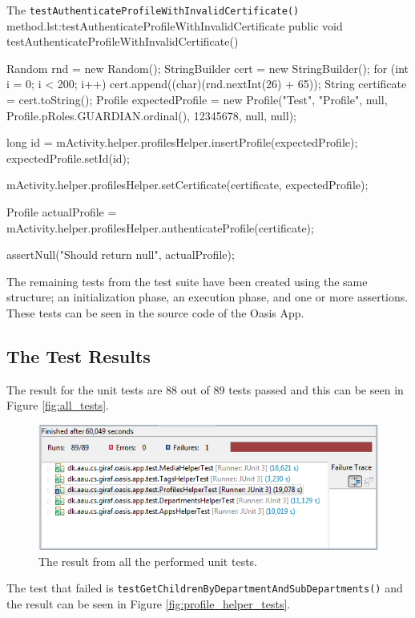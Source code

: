 \begin{Java}{The \texttt{testAuthenticateProfileWithInvalidCertificate()} method.}{lst:testAuthenticateProfileWithInvalidCertificate}
public void testAuthenticateProfileWithInvalidCertificate() {
	Random rnd = new Random();
	StringBuilder cert = new StringBuilder();
	for (int i = 0; i < 200; i++)
	{
		cert.append((char)(rnd.nextInt(26) + 65));
	}
	String certificate = cert.toString();
	Profile expectedProfile = new Profile("Test", "Profile", null, Profile.pRoles.GUARDIAN.ordinal(), 12345678, null, null);

	long id = mActivity.helper.profilesHelper.insertProfile(expectedProfile);
	expectedProfile.setId(id);
	
	mActivity.helper.profilesHelper.setCertificate(certificate, expectedProfile);
			
	Profile actualProfile = mActivity.helper.profilesHelper.authenticateProfile(certificate);

	assertNull("Should return null", actualProfile);
}
\end{Java}

The remaining tests from the test suite have been created using the same structure; an initialization phase, an execution  phase, and one or more assertions.
These tests can be seen in the source code of the Oasis App.

\subsection{The Test Results}
The result for the unit tests are 88 out of 89 tests passed and this can be seen in Figure \vref{fig:all_tests}.

\begin{figure}[htbp]
	\centering
		\includegraphics[width=\textwidth]{Images/unit_testing/all_tests.PNG}
	\caption{The result from all the performed unit tests.}
	\label{fig:all_tests}
\end{figure}

The test that failed is \texttt{testGetChildrenByDepartmentAndSubDepartments()} and the result can be seen in Figure \vref{fig:profile_helper_tests}.

